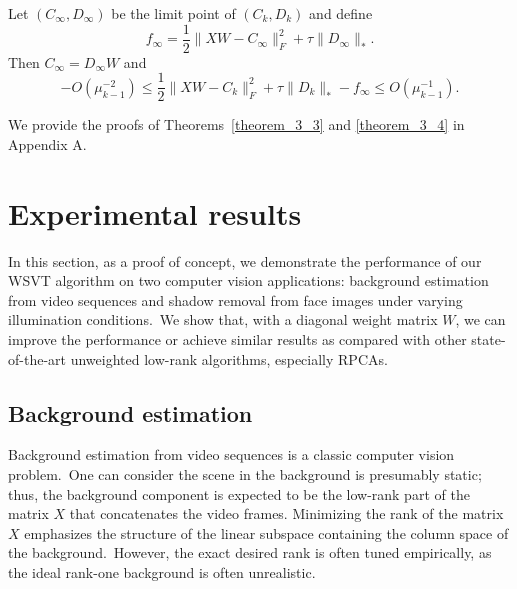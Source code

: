 \documentclass[twoside,11pt]{article}
\begin{document}
\begin{theorem}\label{theorem_3_4}
	Let $(C_{\infty},D_{\infty})$ be the limit point of $(C_k,D_k)$ and define $$f_{\infty} =  \frac{1}{2}\|XW-C_{\infty}\|_F^2 +\tau\|D_{\infty}\|_\ast.$$ Then $C_{\infty}=D_{\infty}W$ and
	$$-O(\mu_{k-1}^{-2})\le \frac{1}{2}\|XW-C_k\|_F^2 +\tau\|D_k\|_\ast-f_{\infty} \le O(\mu_{k-1}^{-1}).$$
\end{theorem}

We provide the proofs of Theorems~\ref{theorem_3_3} and \ref{theorem_3_4} in Appendix A. 
\section{Experimental results}

In this section, as a proof of concept, we demonstrate the performance of our WSVT algorithm on two computer vision applications: background estimation from video sequences and shadow removal from face images under varying illumination conditions.~We show that, with a diagonal weight matrix $W$, we can improve the performance or achieve similar results as compared with other state-of-the-art unweighted low-rank algorithms, especially RPCAs.

\subsection{Background estimation}
Background estimation from video sequences is a classic computer vision problem.~One can consider the scene in the background is presumably static; thus, the background component is expected to be the low-rank part of the matrix $X$ that concatenates the video frames. Minimizing the rank of the matrix $X$ emphasizes the structure of the linear subspace containing the column space of the background.~However, the exact desired rank is often tuned empirically, as the ideal rank-one background is often unrealistic. 
\end{document}
